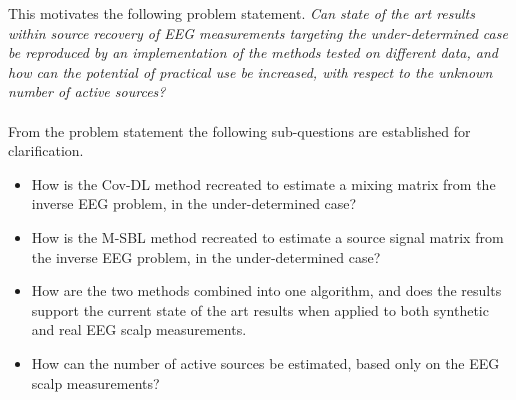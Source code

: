 This motivates the following problem statement.
\clearpage
\textit{Can state of the art results within source recovery of EEG measurements targeting the under-determined case be reproduced by an implementation of the methods tested on different data, and how can the potential of practical use be increased, with respect to the unknown number of active sources?}
\\ \\
From the problem statement the following sub-questions are established for clarification.

\begin{itemize}
\item How is the Cov-DL method recreated to estimate a mixing matrix from the inverse EEG problem, in the under-determined case?\item How is the M-SBL method recreated to estimate a source signal matrix from the inverse EEG problem, in the under-determined case?
\item How are the two methods combined into one algorithm, and does the results support the current state of the art results when applied to both synthetic and real EEG scalp measurements. 
\item How can the number of active sources be estimated, based only on the EEG scalp measurements? 
\end{itemize}